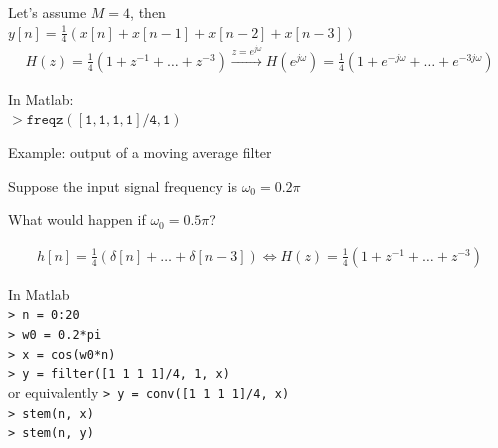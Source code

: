 \documentclass[10pt]{beamer}
\begin{document}
\begin{frame}
\vspace{0.5cm}
Let's assume $M = 4$, then $y[n] = \frac{1}{4}(x[n] + x[n-1] + x[n-2] + x[n-3])$
\begin{align*}
H(z) = \frac{1}{4}(1 + z^{-1} + \ldots + z^{-3}) \xrightarrow{z = e^{j\omega}} H(e^{j\omega}) = \frac{1}{4}(1 + e^{-j\omega} + \ldots+ e^{-3j\omega})
\end{align*}

In Matlab:\\
$> \mathtt{freqz([1, 1, 1, 1]/4, 1)}$

\begin{center}
\end{center}

\end{frame}

\begin{frame}{Example: output of a moving average filter}

 {Suppose the input signal frequency is $\omega_0 = 0.2\pi$}

 {What would happen if $\omega_0 = 0.5\pi$?}

\begin{center}
	\resizebox{\linewidth}{!}{}
\end{center}
\begin{align*}
h[n] = \frac{1}{4}(\delta[n] + \ldots + \delta[n-3]) \Longleftrightarrow H(z) = \frac{1}{4}(1 + z^{-1} + \ldots + z^{-3})
\end{align*}

\end{frame}

\begin{frame}
	
In Matlab \\
\texttt{> n = 0:20} \\
\texttt{> w0 = 0.2*pi} \\
\texttt{> x = cos(w0*n)} \\
\texttt{> y = filter([1 1 1 1]/4, 1, x)} \\
or equivalently \texttt{> y = conv([1 1 1 1]/4, x)} \\
\texttt{> stem(n, x)} \\
\texttt{> stem(n, y)} \\

\end{frame}
\end{document}
